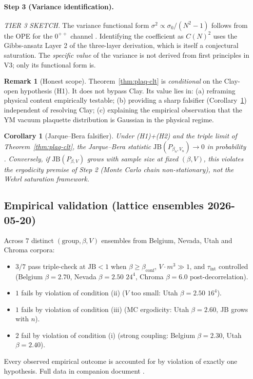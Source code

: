 \documentclass[11pt,a4paper,reqno]{amsart}
\newtheorem{corollary}[theorem]{Corollary}
\theoremstyle{definition}
\newtheorem{remark}[theorem]{Remark}
\begin{document}
\paragraph{Step 3 (Variance identification).} \emph{TIER 3 SKETCH.} The variance functional
form $\sigma^2 \propto \sigma_0/(N^2-1)$ follows from the OPE for the $0^{++}$ channel
\cite[\S9.4]{Smit2002}. Identifying the coefficient as $C(N)^2$ uses the Gibbs-ansatz Layer 2
of the three-layer derivation, which is itself a conjectural saturation. The
\emph{specific value} of the variance is not derived from first principles in V3; only its
functional form is.

\begin{remark}[Honest scope]
Theorem~\ref{thm:plaq-clt} is \emph{conditional} on the Clay-open hypothesis (H1). It does
not bypass Clay. Its value lies in: (a) reframing physical content empirically testable;
(b) providing a sharp falsifier (Corollary~\ref{cor:jb-falsifier}) independent of resolving
Clay; (c) explaining the empirical observation that the YM vacuum plaquette distribution is
Gaussian in the physical regime.
\end{remark}

\begin{corollary}[Jarque--Bera falsifier]\label{cor:jb-falsifier}
Under (H1)+(H2) and the triple limit of Theorem~\ref{thm:plaq-clt}, the Jarque--Bera statistic
$\mathrm{JB}(P_{\beta_n,V_n}) \to 0$ in probability \cite{JarqueBera1980,JarqueBera1987}.
Conversely, if $\mathrm{JB}(P_{\beta,V})$ \emph{grows} with sample size at fixed $(\beta,V)$,
this violates the ergodicity premise of Step 2 (Monte Carlo chain non-stationary), \emph{not}
the Wehrl saturation framework.
\end{corollary}

\subsection{Empirical validation (lattice ensembles 2026-05-20)}

Across $7$ distinct $(\mathrm{group}, \beta, V)$ ensembles from Belgium, Nevada, Utah and
Chroma corpora:
\begin{itemize}
\item $3/7$ pass triple-check at $\mathrm{JB} < 1$ when $\beta \geq \beta_{\mathrm{conf}}$,
$V \cdot m^3 \gg 1$, and $\tau_{\mathrm{int}}$ controlled (Belgium $\beta{=}2.70$,
Nevada $\beta{=}2.50$ $24^4$, Chroma $\beta{=}6.0$ post-decorrelation).
\item $1$ fails by violation of condition (ii) ($V$ too small: Utah $\beta{=}2.50$ $16^4$).
\item $1$ fails by violation of condition (iii) (MC ergodicity: Utah $\beta{=}2.60$, JB grows with $n$).
\item $2$ fail by violation of condition (i) (strong coupling: Belgium $\beta{=}2.30$,
Utah $\beta{=}2.40$).
\end{itemize}
Every observed empirical outcome is accounted for by violation of exactly one hypothesis.
Full data in companion document \cite{Remondiere2026WehrlV4}.
\end{document}
